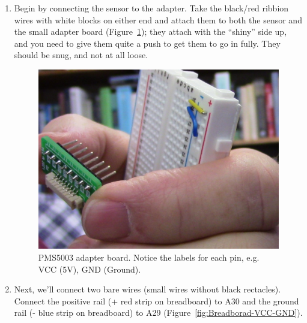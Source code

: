 \documentclass{article}
\begin{document}
\begin{enumerate}
  \item Begin by connecting the sensor to the adapter. Take the black/red ribbion wires with white blocks on either end and attach them to both the sensor and the small adapter board (Figure~\ref{fig:PMS5003_adapter}); they attach with the ``shiny'' side up, and you need to give them quite a push to get them to go in fully. They should be snug, and not at all loose.
  
\begin{figure}
\includegraphics[width=1.00\textwidth]{images/2_PMS5003_Adapter.JPG}
\caption{PMS5003 adapter board. Notice the labels for each pin, e.g. VCC (5V), GND (Ground).}
\label{fig:PMS5003_adapter}
\end{figure}

  \item Next, we'll connect two bare wires (small wires without black rectacles). Connect the positive rail (+ red strip on breadboard) to A30 and the ground rail (- blue strip on breadboard) to A29 (Figure~\ref{fig:Breadborad-VCC-GND}). 
  

\end{enumerate}
\end{document}
